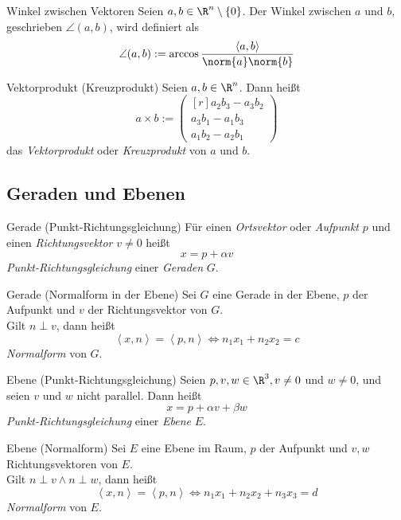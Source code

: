 \documentclass[german]{../spicker}
\newcommand{\scalarprod}[1]{\left\langle #1 \right\rangle}
\newcommand{\vektor}[1]{\begin{pmatrix*}[r] #1 \end{pmatrix*}}
\begin{document}
\begin{defi}{Winkel zwischen Vektoren}
    Seien $a, b\in \R^n\setminus \{0\}$.
    Der Winkel zwischen $a$ und $b$, geschrieben $\angle (a, b)$, wird definiert als
    $$
        \angle (a, b) := \arccos \frac{\scalarprod{a, b}}{\norm{a} \norm{b}}
    $$
\end{defi}

\begin{defi}{Vektorprodukt (Kreuzprodukt)}
    Seien $a, b \in \R^n$. Dann heißt
    $$
        a \times b := \vektor{a_2b_3-a_3b_2 \\ a_3b_1-a_1b_3 \\ a_1b_2 - a_2b_1}
    $$
    das \emph{Vektorprodukt} oder \emph{Kreuzprodukt} von $a$ und $b$.
\end{defi}

\newpage
\subsection{Geraden und Ebenen}

\begin{defi}{Gerade (Punkt-Richtungsgleichung)}
    Für einen \emph{Ortsvektor} oder \emph{Aufpunkt} $p$ und einen \emph{Richtungsvektor} $v \neq 0$ heißt
    $$
        x = p + \alpha v
    $$
    \emph{Punkt-Richtungsgleichung} einer \emph{Geraden} $G$.
\end{defi}

\begin{defi}{Gerade (Normalform in der Ebene)}
    Sei $G$ eine Gerade in der Ebene, $p$ der Aufpunkt und $v$ der Richtungsvektor von $G$.\\
    Gilt $n \perp v$, dann heißt
    $$
        \scalarprod{x,n} = \scalarprod{p, n} \iff n_1x_1 + n_2x_2 = c
    $$
    \emph{Normalform} von $G$.
\end{defi}

\begin{defi}{Ebene (Punkt-Richtungsgleichung)}
    Seien $p, v, w \in \R^3, v\neq 0$ und $w \neq 0$, und seien $v$ und $w$ nicht parallel.
    Dann heißt
    $$
        x = p + \alpha v + \beta w
    $$
    \emph{Punkt-Richtungsgleichung} einer \emph{Ebene} $E$.
\end{defi}

\begin{defi}{Ebene (Normalform)}
    Sei $E$ eine Ebene im Raum, $p$ der Aufpunkt und $v, w$ Richtungsvektoren von $E$. \\
    Gilt $n \perp v \land n \perp w$, dann heißt
    $$
        \scalarprod{x, n} = \scalarprod{p, n} \iff n_1x_1 + n_2x_2 + n_3x_3 = d
    $$
    \emph{Normalform} von $E$.
\end{defi}
\end{document}

